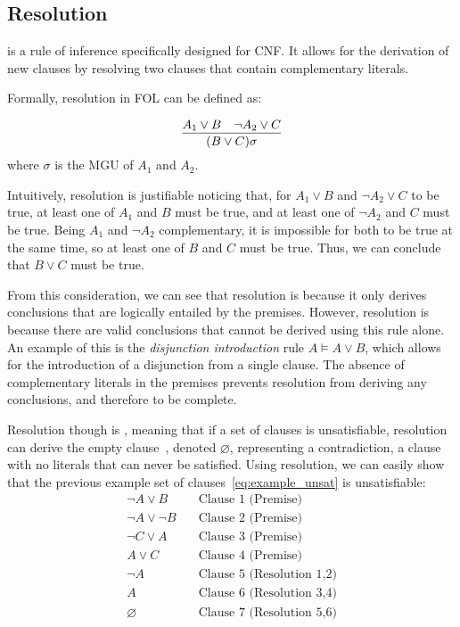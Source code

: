 \subsection{Resolution}\label{subsec:resolution}

 is a rule of inference specifically designed for CNF\@. It allows for the derivation of new clauses by resolving two clauses that contain complementary literals.

Formally, resolution in FOL can be defined as:

\begin{equation}
  \infer{(B\lor C)\sigma}{A_1 \lor B & \neg A_2 \lor C}
\end{equation}
\indent where \(\sigma\) is the MGU of \(A_1\) and \(A_2\).

\noindent Intuitively, resolution is justifiable noticing that, for \(A_1 \lor B\) and \(\neg A_2 \lor C\) to be true, at least one of \(A_1\) and \(B\) must be true, and at least one of \(\neg A_2\) and \(C\) must be true.
Being \(A_1\) and \(\neg A_2\) complementary, it is impossible for both to be true at the same time, so at least one of \(B\) and \(C\) must be true. Thus, we can conclude that \(B \lor C\) must be true.

From this consideration, we can see that resolution is  because it only derives conclusions that are logically entailed by the premises.
However, resolution is  because there are valid conclusions that cannot be derived using this rule alone.
An example of this is the \emph{disjunction introduction} rule \(A \models A \lor B\), which allows for the introduction of a disjunction from a single clause.
The absence of complementary literals in the premises prevents resolution from deriving any conclusions, and therefore to be complete.

Resolution though is , meaning that if a set of clauses is unsatisfiable, resolution can derive the empty clause~\cite{robinson1965}, denoted \(\varnothing\), representing a contradiction, a clause with no literals that can never be satisfied.
Using resolution, we can easily show that the previous example set of clauses~\ref{eq:example_unsat} is unsatisfiable:
\begin{equation}
  \begin{aligned}
    \neg A \lor B &\quad \text{Clause 1 (Premise)} \\
    \neg A \lor \neg B &\quad \text{Clause 2 (Premise)} \\
    \neg C \lor A &\quad \text{Clause 3 (Premise)} \\
    A \lor C &\quad \text{Clause 4 (Premise)} \\
    \neg A &\quad \text{Clause 5 (Resolution 1,2)} \\
    A &\quad \text{Clause 6 (Resolution 3,4)} \\
    \varnothing &\quad \text{Clause 7 (Resolution 5,6)}
  \end{aligned}
\end{equation}

